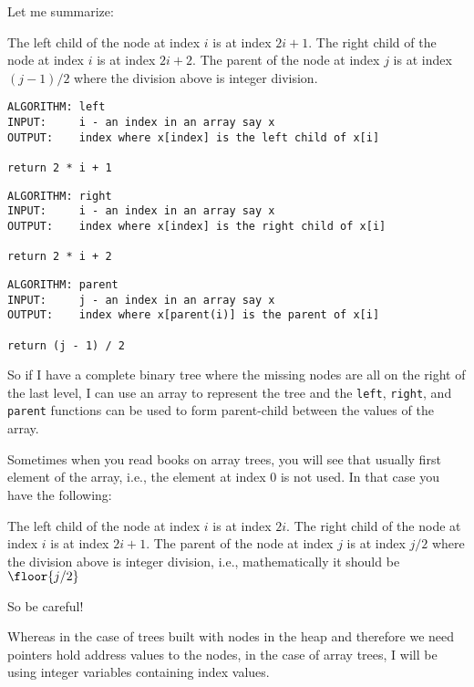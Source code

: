 Let me summarize:
\begin{tightlist}
\li The left child of the node at index $i$ is at index $2i+1$.
\li The right child of the node at index $i$ is at index $2i+2$.
\li The parent of the node at index $j$ is at index $(j - 1)/2$
    where the division above is integer division.
\end{tightlist}


\begin{Verbatim}[frame=single]
ALGORITHM: left
INPUT:     i - an index in an array say x
OUTPUT:    index where x[index] is the left child of x[i]

return 2 * i + 1
\end{Verbatim}
\begin{Verbatim}[frame=single]
ALGORITHM: right
INPUT:     i - an index in an array say x
OUTPUT:    index where x[index] is the right child of x[i]

return 2 * i + 2
\end{Verbatim}
\begin{Verbatim}[frame=single]
ALGORITHM: parent
INPUT:     j - an index in an array say x
OUTPUT:    index where x[parent(i)] is the parent of x[i]

return (j - 1) / 2
\end{Verbatim}

So if I have a complete binary tree where
the missing nodes are all on the right of the last level,
I can use an array to represent the tree
and the \verb!left!, \verb!right!, and \verb!parent!
functions
can be used to form parent-child
between the values of the array.

Sometimes when you read books on array trees, you will see that
usually first element of the array, i.e., the element at
index 0 is not used.
In that case you have the following:
\begin{tightlist}
\li The left child of the node at index $i$ is at index $2i$.
\li The right child of the node at index $i$ is at index $2i+1$.
\li The parent of the node at index $j$ is at index $j / 2$
    where the division above is integer division, i.e., 
    mathematically it should be 
    $\floor{j / 2}$
\end{tightlist}
So be careful!

Whereas in the case of trees built with nodes in the heap
and therefore we need pointers hold address values to the nodes,
in the case of array trees, I will be using integer variables
containing index values.




